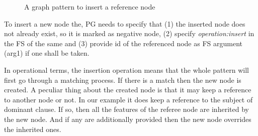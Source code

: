 
\begin{figure}[H]
\centering
{}
\caption{A graph pattern to insert a reference node}
\label{fig:gp5}
\end{figure}


To insert a new node the, PG needs to specify that (1) the inserted node does not already exist, so it is marked as negative node, (2) specify \textit{operation:insert} in the FS of the same and (3) provide id of the referenced node as FS argument (arg1) if one shall be taken.

In operational terms, the insertion operation means that the whole pattern will first go through a matching process. If there is a match then the new node is created. A peculiar thing about the created node is that it may keep a reference to another node or not. In our example it does keep a reference to the subject of dominant clause. If so, then all the features of the referee node are inherited by the new node. And if any are additionally provided then the new node overrides the inherited ones.

